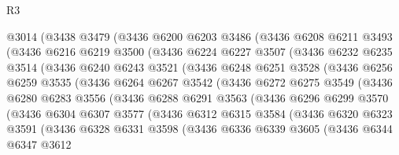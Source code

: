 \begin{lexlean}{R3}
\begin{coremodule}
    @3014
      (@3438
        @3479
        (@3436
          @6200
          @6203
          @3486
          (@3436
            @6208
            @6211
            @3493
            (@3436
              @6216
              @6219
              @3500
              (@3436
                @6224
                @6227
                @3507
                (@3436
                  @6232
                  @6235
                  @3514
                  (@3436
                    @6240
                    @6243
                    @3521
                    (@3436
                      @6248
                      @6251
                      @3528
                      (@3436
                        @6256
                        @6259
                        @3535
                        (@3436
                          @6264
                          @6267
                          @3542
                          (@3436
                            @6272
                            @6275
                            @3549
                            (@3436
                              @6280
                              @6283
                              @3556
                              (@3436
                                @6288
                                @6291
                                @3563
                                (@3436
                                  @6296
                                  @6299
                                  @3570
                                  (@3436
                                    @6304
                                    @6307
                                    @3577
                                    (@3436
                                      @6312
                                      @6315
                                      @3584
                                      (@3436
                                        @6320
                                        @6323
                                        @3591
                                        (@3436
                                          @6328
                                          @6331
                                          @3598
                                          (@3436
                                            @6336
                                            @6339
                                            @3605
                                            (@3436
                                              @6344
                                              @6347
                                              @3612

\end{coremodule}
\end{lexlean}
